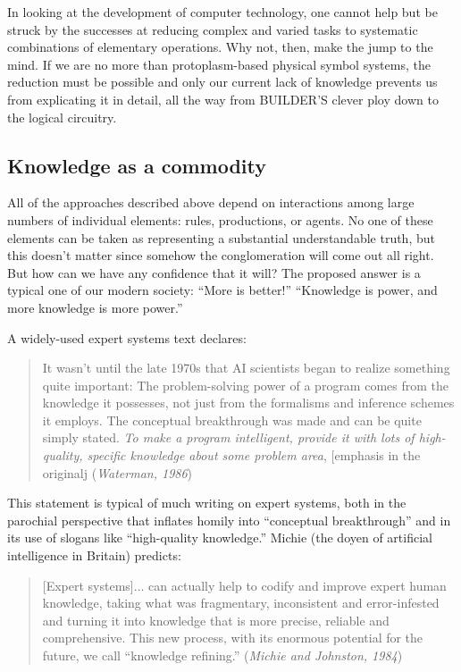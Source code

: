 \documentclass[12pt]{article}
\def\bq{\begin{quote}}
\def\eq{\end{quote}}
\begin{document}
In looking at the development of computer technology, one cannot help but be struck by the successes at reducing complex and varied tasks to systematic combinations of elementary operations. Why not, then, make the jump to the mind. If we are no more than protoplasm-based physical symbol systems, the reduction must be possible and only our current lack of knowledge prevents us from explicating it in detail, all the way from BUILDER’S clever ploy down to the logical circuitry.

\subsection{Knowledge as a commodity}

All of the approaches described above depend on interactions among large numbers of individual elements: rules, productions, or agents. No one of these elements can be taken as representing a substantial understandable truth, but this doesn’t matter since somehow the conglomeration will come out all right. But how can we have any confidence that it will? The proposed answer is a typical one of our modern society: ``More is better!'' ``Knowledge is power, and more knowledge is more power.''

A widely-used expert systems text declares:

\bq
It wasn’t until the late 1970s that AI scientists began to realize something quite important: The problem-solving power of a program comes from the knowledge it possesses, not just from the formalisms and inference schemes it employs. The conceptual breakthrough was made and can be quite simply stated. {\it To make a program intelligent, provide it with lots of high-quality, specific knowledge about some problem area}, [emphasis in the originalj ({\it Waterman, 1986})
\eq

This statement is typical of much writing on expert systems, both in the parochial perspective that inflates homily into ``conceptual breakthrough'' and in its use of slogans like ``high-quality knowledge.'' Michie (the doyen of artificial intelligence in Britain) predicts:

\bq
[Expert systems]... can actually help to codify and improve expert human knowledge, taking what was fragmentary, inconsistent and error-infested and turning it into knowledge that is more precise, reliable and comprehensive. This new process, with its enormous potential for the future, we call ``knowledge refining.'' ({\it Michie and Johnston, 1984})
\eq
\end{document}

